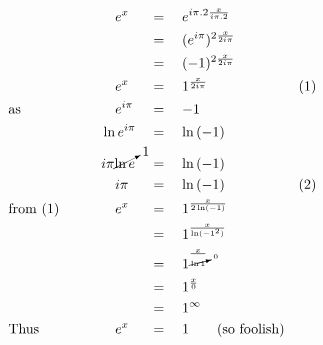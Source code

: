 \begin{alignat*}{5}
&\,&&\quad e^x&&=\quad e^{i\pi.2\frac{x}{i\pi.2}}\\
&\,&&\,&&=\quad(e^{i\pi})^{2\frac{x}{2i\pi}}\\
&\,&&\,&&=\quad(-1)^{2\frac{x}{2i\pi}}\\
&\,&&\quad e^x&&=\quad1^\frac{x}{2i\pi}\qquad&&(1)\\
&\mathrm{as}\qquad&&\quad e^{i\pi}&&=\quad-1\\
&\,&&\ln{e^{i\pi}}&&=\quad\ln{(-1)}\\
&\,&&i\pi\cancelto{1}{\ln{e}}&&=\quad\ln{(-1)}\\
&\,&&\quad i\pi&&=\quad\ln{(-1)}\qquad&&(2)\\
&\mathrm{from~(1)}\qquad&&\quad e^x&&=\quad1^\frac{x}{2\ln(-1)}\\
&\,&&\,&&=\quad1^\frac{x}{\ln(-1^2)}\\
&\,&&\,&&=\quad1^\frac{x}{\cancelto{0}{\ln{1}}}\\
&\,&&\,&&=\quad1^\frac{x}{0}\\
&\,&&\,&&=\quad1^\infty\\
&\mathrm{Thus}\qquad&&\quad e^x&&=\quad1\qquad\mathrm{(so~foolish)}
\end{alignat*}

